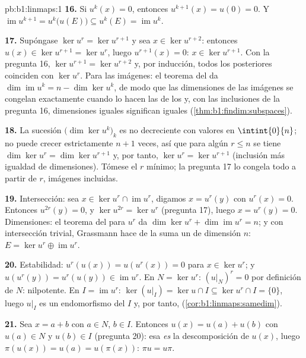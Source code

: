 \begin{solution}{pb:b1:linmaps:1}
\textbf{16.} Si $u^k(x) = 0$, entonces $u^{k+1}(x) = u(0) = 0$. Y
$\operatorname{im} u^{k+1} = u^k\bigl(u(E)\bigr) \subseteq
u^k(E) = \operatorname{im} u^k$.

\textbf{17.} Supóngase $\ker u^{r} = \ker u^{r+1}$ y sea
$x \in \ker u^{r+2}$: entonces $u(x) \in \ker u^{r+1} = \ker u^{r}$,
luego $u^{r+1}(x) = 0$: $x \in \ker u^{r+1}$. Con la pregunta 16,
$\ker u^{r+1} = \ker u^{r+2}$ y, por inducción, todos los 
posteriores coinciden con $\ker u^{r}$. Para las imágenes: el
teorema del  da $\dim\operatorname{im} u^k = n - \dim\ker u^k$,
de modo que las dimensiones de las imágenes se congelan exactamente
cuando lo hacen las de los  y, con las inclusiones de la
pregunta 16, dimensiones iguales significan  iguales
(\cref{thm:b1:findim:subspaces}).

\textbf{18.} La sucesión $\bigl(\dim\ker u^k\bigr)_k$ es no
decreciente con valores en $\intint{0}{n}$; no puede crecer
estrictamente $n + 1$ veces, así que para algún $r \leq n$ se tiene
$\dim\ker u^{r} = \dim\ker u^{r+1}$ y, por tanto,
$\ker u^{r} = \ker u^{r+1}$ (inclusión más igualdad de dimensiones).
Tómese el $r$ mínimo; la pregunta 17 lo congela todo a partir de $r$,
imágenes incluidas.

\textbf{19.} Intersección: sea
$x \in \ker u^{r} \cap \operatorname{im} u^{r}$, digamos
$x = u^{r}(y)$ con $u^{r}(x) = 0$. Entonces $u^{2r}(y) = 0$, y
$\ker u^{2r} = \ker u^{r}$ (pregunta 17), luego $x = u^{r}(y) = 0$.
Dimensiones: el teorema del  para $u^{r}$ da
$\dim\ker u^{r} + \dim\operatorname{im} u^{r} = n$; y con
intersección trivial, Grassmann hace de la suma un  de
dimensión $n$: $E = \ker u^{r} \oplus \operatorname{im} u^{r}$.

\textbf{20.} Estabilidad: $u^{r}(u(x)) = u(u^{r}(x)) = 0$ para
$x \in \ker u^{r}$; y
$u(u^{r}(y)) = u^{r}(u(y)) \in \operatorname{im} u^{r}$. En
$N = \ker u^{r}$: $(u|_N)^{r} = 0$ por definición de $N$: nilpotente.
En $I = \operatorname{im} u^{r}$:
$\ker(u|_I) = \ker u \cap I \subseteq \ker u^{r} \cap I = \{0\}$,
luego $u|_I$ es un endomorfismo  del $I$  y, por tanto, 
(\cref{cor:b1:linmaps:samedim}).

\textbf{21.} Sea $x = a + b$ con $a \in N$, $b \in I$. Entonces
$u(x) = u(a) + u(b)$ con $u(a) \in N$ y $u(b) \in I$ (pregunta 20):
esa \emph{es} la descomposición de $u(x)$, luego
$\pi(u(x)) = u(a) = u(\pi(x))$: $\pi u = u\pi$.


\end{solution}
